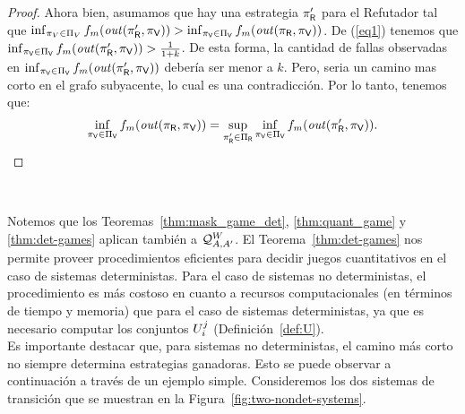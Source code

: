 \begin{proof}
Ahora bien, asumamos que hay una estrategia $\pi_{\mathsf{R}}'$ para el Refutador tal que 
$\inf_{\pi_V \in \Pi_V} f_m (\mathit{out}(\pi_{\mathsf{R}}', \pi_{\mathsf{V}})) > \inf_{\pi_{\mathsf{V}} \in \Pi_{\mathsf{V}}} f_m (\mathit{out}(\pi_{\mathsf{R}}, \pi_{\mathsf{V}}))$.
De (\ref{eq1}) tenemos que $\inf_{\pi_{\mathsf{V}} \in \Pi_{\mathsf{V}}} f_m(\mathit{out}(\pi_{\mathsf{R}}', \pi_{\mathsf{V}})) > \frac{1}{1+k}$. 
De esta forma, la cantidad de fallas observadas en 
$\inf_{\pi_{\mathsf{V}} \in \Pi_{\mathsf{V}}} f_m(\mathit{out}(\pi_{\mathsf{R}}', \pi_{\mathsf{V}}))$ debería ser menor a $k$. 
Pero, seria un camino mas corto en el grafo subyacente, lo cual es una contradicción. Por lo tanto, tenemos que:
\[	
	\inf_{\pi_{\mathsf{V}} \in \Pi_{\mathsf{V}}} f_m(\mathit{out}(\pi_{\mathsf{R}}, \pi_{\mathsf{V}})) = \sup_{\pi_{\mathsf{R}}' \in \Pi_{\mathsf{R}}} \inf_{\pi_{\mathsf{V}} \in \Pi_{\mathsf{V}}} f_m( \mathit{out}(\pi_{\mathsf{R}}',\pi_{\mathsf{V}})).
\]	
\qedhere
\end{proof} \\
\fi

Notemos que los Teoremas~\ref{thm:mask_game_det}, \ref{thm:quant_game} y \ref{thm:det-games} aplican también a 
$\mathcal{Q}^W_{A,A'}$.
El Teorema~\ref{thm:det-games} nos permite proveer procedimientos eficientes para decidir juegos cuantitativos en el caso de sistemas deterministas. Para el caso de sistemas no deterministas, el procedimiento es más costoso en cuanto a recursos computacionales (en términos de tiempo y memoria) que para el caso de sistemas deterministas, ya que es necesario computar los conjuntos $U^j_i$ (Definición~\ref{def:U}). \\

Es importante destacar que, para sistemas no deterministas, el camino más corto no siempre determina estrategias ganadoras. Esto se puede observar a continuación a través de un ejemplo simple. Consideremos los dos sistemas de transición que se muestran en la Figura~\ref{fig:two-nondet-systems}.


